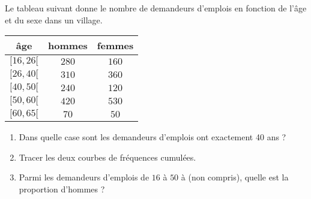 
\begin{exercice}\label{exoSeconde-0034}

    Le tableau suivant donne le nombre de demandeurs d'emplois en fonction de l'âge et du sexe dans un village.

    \begin{center}
        \begin{tabular}{|c|c|c|}
            \hline
            âge&hommes&femmes\\
            \hline\hline
            \( \mathopen[ 16 , 26 [\)&\( 280\)&\( 160\)\\
                \hline
                \( \mathopen[ 26 , 40 [\)&\( 310\)&\( 360\)\\
                    \hline
            \( \mathopen[ 40 , 50 [\)&\( 240\)&\( 120\)\\
                \hline
             \( \mathopen[ 50 , 60 [\)&\( 420\)&\( 530\)\\
                 \hline
              \( \mathopen[ 60 , 65 [\)&$70$&$50$\\
                  \hline
        \end{tabular}
    \end{center}

    \begin{enumerate}
        \item
    Dans quelle case sont les demandeurs d'emplois ont exactement 40 ans ?
\item 
    Tracer les deux courbes de fréquences cumulées. 
\item
    Parmi les demandeurs d'emplois de \( 16\) à \( 50\) à (non compris), quelle est la proportion d'hommes ?
            
    \end{enumerate}

\end{exercice}
